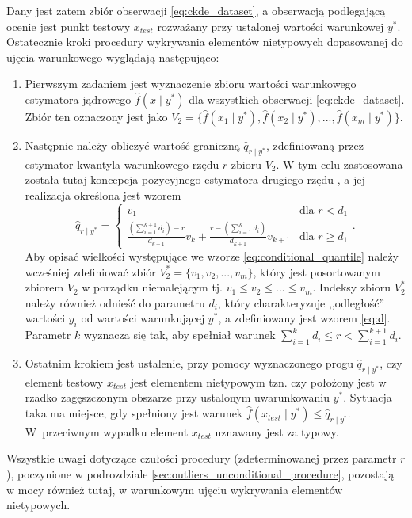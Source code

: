 \documentclass[12pt,a4paper,oneside]{book}
\theoremstyle{definition}
\begin{document}
Dany jest zatem zbiór obserwacji \eqref{eq:ckde_dataset}, a obserwacją podlegającą ocenie jest punkt testowy $x_{test}$ rozważany przy ustalonej wartości warunkowej $y^*$. Ostatecznie kroki procedury wykrywania elementów nietypowych dopasowanej do ujęcia warunkowego wyglądają następująco:
\begin{enumerate}
\item Pierwszym zadaniem jest wyznaczenie zbioru wartości warunkowego estymatora jądrowego $\hat{f}(x \mid y^*)$ dla wszystkich obserwacji \eqref{eq:ckde_dataset}. Zbiór ten oznaczony jest jako $V_2=\{\hat{f}(x_1 \mid y^*),\hat{f}(x_2 \mid y^*), ..., \hat{f}(x_m \mid y^*)\}$.
\item Następnie należy obliczyć wartość graniczną $\hat{q}_{r \mid y^*}$, zdefiniowaną przez estymator kwantyla warunkowego rzędu $r$ zbioru $V_2$. W tym celu zastosowana została tutaj koncepcja pozycyjnego estymatora drugiego rzędu \cite{Parrish_1990}, a jej realizacja określona jest wzorem
\begin{equation} \label{eq:conditional_quantile}
\hat{q}_{r \mid y^*} =
  \begin{cases}
    v_1 & \text{dla } r < d_1 \\
    \frac{\left( \sum_{i=1}^{k+1} d_i \right) - r}{d_{k+1}} v_k + \frac{r - \left( \sum_{i=1}^k d_i \right)}{d_{k+1}} v_{k+1} & \text{dla } r \geq d_1
  \end{cases}  .     
\end{equation}
Aby opisać wielkości występujące we wzorze \eqref{eq:conditional_quantile} należy wcześniej zdefiniować zbiór $V_2^*=\{v_1,v_2,...,v_m\}$, który jest posortowanym zbiorem $V_2$ w porządku niemalejącym tj. $v_1 \leq v_2 \leq ... \leq v_m$. Indeksy zbioru $V_2^*$ należy również odnieść do parametru $d_i$, który charakteryzuje ,,odległość'' wartości $y_i$ od wartości warunkującej $y^*$, a zdefiniowany jest wzorem \eqref{eq:d}. Parametr $k$ wyznacza się tak, aby spełniał warunek $\sum_{i=1}^k d_i \leq r < \sum_{i=1}^{k+1} d_i$.
\item Ostatnim krokiem jest ustalenie, przy pomocy wyznaczonego progu $\hat{q}_{r \mid y^*}$, czy element testowy $x_{test}$ jest elementem nietypowym tzn. czy położony jest w rzadko zagęszczonym obszarze przy ustalonym uwarunkowaniu $y^*$. Sytuacja taka ma miejsce, gdy spełniony jest warunek $\hat{f}(x_{test} \mid y^*) \leq \hat{q}_{r \mid y^*}$. W~przeciwnym wypadku element $x_{test}$ uznawany jest za typowy.
\end{enumerate}
Wszystkie uwagi dotyczące czułości procedury (zdeterminowanej przez parametr $r$), poczynione w podrozdziale \ref{sec:outliers_unconditional_procedure}, pozostają w mocy również tutaj, w warunkowym ujęciu wykrywania elementów nietypowych.
\end{document}
